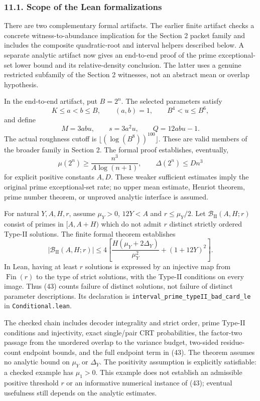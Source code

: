 \documentclass[
  english,
  11pt,
]{article}
\begin{document}
\subsubsection{11.1. Scope of the Lean
formalizations}\label{scope-of-the-lean-formalizations}

There are two complementary formal artifacts. The earlier finite
artifact checks a concrete witness-to-abundance implication for the
Section 2 packet family and includes the composite quadratic-root and
interval helpers described below. A separate analytic artifact now gives
an end-to-end proof of the prime exceptional-set lower bound and its
relative-density conclusion. The latter uses a genuine restricted
subfamily of the Section 2 witnesses, not an abstract mean or overlap
hypothesis.

In the end-to-end artifact, put \(B=2^n\). The selected parameters satisfy
\[
K\le a<b\le B,\qquad (a,b)=1,\qquad B^4<u\le B^6,
\]
and define
\[
M=3abu,\qquad s=3a^2u,\qquad Q=12abu-1.
\]
The actual roughness cutoff is
\(\lfloor(\log(B^8))^{100}\rfloor\). These are valid members of the broader
family in Section 2. The formal proof establishes, eventually,
\[
\mu(2^n)\ge \frac{n^3}{A\log(n+1)},\qquad
\Delta(2^n)\le Dn^3
\]
for explicit positive constants \(A,D\). These weaker sufficient estimates
imply the original prime exceptional-set rate; no upper mean estimate,
Henriot theorem, prime number theorem, or unproved analytic interface is
assumed.

For natural \(Y,A,H,r\), assume \(\mu_Y>0\), \(12Y<A\) and
\(r\le\mu_Y/2\). Let \(\mathcal B_{\mathrm{II}}(A,H;r)\) consist of
primes in \([A,A+H)\) which do not admit \(r\) distinct strictly ordered
Type-II solutions. The finite formal theorem establishes \[
|\mathcal B_{\mathrm{II}}(A,H;r)|
\le4\left[
\frac{H(\mu_Y+2\Delta_Y)}{\mu_Y^2}+(1+12Y)^2
\right]. \tag{43}
\] In Lean, having at least \(r\) solutions is expressed by an injective
map from \(\operatorname{Fin}(r)\) to the type of strict solutions, with
the Type-II conditions on every image. Thus (43) counts failure of
distinct solutions, not failure of distinct parameter descriptions. Its
declaration is \texttt{interval\_prime\_typeII\_bad\_card\_le} in
\texttt{Conditional.lean}.

The checked chain includes decoder integrality and strict order, prime
Type-II conditions and injectivity, exact single/pair CRT probabilities,
the factor-two passage from the unordered overlap to the variance
budget, two-sided residue-count endpoint bounds, and the full endpoint
term in (43). The theorem assumes no analytic bound on \(\mu_Y\) or
\(\Delta_Y\). The positivity assumption is explicitly satisfiable: a
checked example has \(\mu_1>0\). This example does not establish an
admissible positive threshold \(r\) or an informative numerical instance
of (43); eventual usefulness still depends on the analytic estimates.
\end{document}
